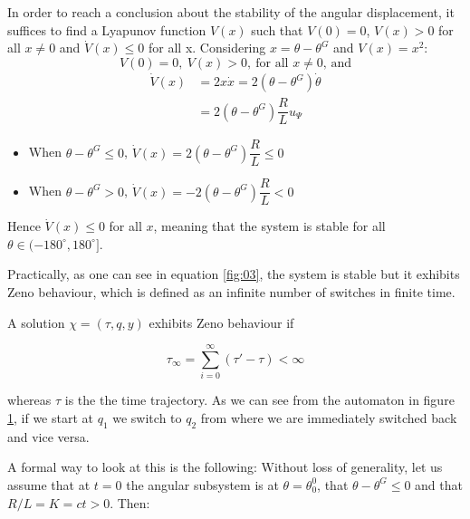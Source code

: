In order to reach a conclusion about the stability of the angular displacement,
it suffices to find a Lyapunov function $V(x)$ such that $V(0) = 0$, $V(x) > 0$
for all $x \neq 0$ and $\dot{V}(x) \leq 0$ for all x. Considering
$x = \theta - \theta^G$ and $V(x) = x^2$:
$$V(0) = 0,\ V(x) > 0,\ \text{for all } x \neq 0\text{, and}$$
\begin{align*}
  \dot{V}(x) &= 2 x \dot{x} = 2 (\theta - \theta^G) \dot{\theta}  \\
             &= 2 (\theta - \theta^G) \dfrac{R}{L} u_{\Psi}
\end{align*}

\begin{itemize}
  \item When $\theta - \theta^G \leq 0$, $\dot{V}(x) = 2 (\theta - \theta^G) \dfrac{R}{L} \leq 0$
  \item When $\theta - \theta^G > 0$, $\dot{V}(x) = -2 (\theta - \theta^G) \dfrac{R}{L} < 0$
\end{itemize}

Hence $\dot{V}(x) \leq 0$ for all $x$, meaning that the system is stable for all
$\theta \in (-180^{\circ}, 180^{\circ}]$.

Practically, as one can see in equation \ref{fig:03}, the system is stable but
it exhibits Zeno behaviour, which is defined as an infinite number of switches
in finite time.

A solution $\chi=(\tau,q,y)$ exhibits Zeno behaviour if

\begin{equation}
  \tau_\infty= \sum_{i=0}^\infty (\tau'-\tau)<\infty
  \label{eq:03.zeno}
\end{equation}

whereas $\tau$ is the the time trajectory. As we can see from the automaton
in figure \ref{fig:03_automaton}, if we start at $q_1$ we switch to $q_2$ from
where we are immediately switched back and vice versa.

\begin{figure}[H]\centering
  \scalebox{1.4}{}
  \caption{}
  \label{fig:03_automaton}
\end{figure}

A formal way to look at this is the following: Without loss of generality,
let us assume that at $t=0$ the angular subsystem is at $\theta = \theta_0^0$,
that $\theta - \theta^G \leq 0$ and that $R/L = K = ct > 0$. Then:

